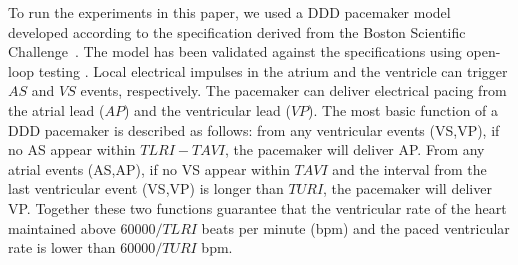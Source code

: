 To run the experiments in this paper, we used a DDD pacemaker model developed according to the specification derived from the Boston Scientific Challenge~\cite{challenge}.
The model has been validated against the specifications using open-loop testing \cite{testing}. 
Local electrical impulses in the atrium and the ventricle can trigger $AS$ and $VS$ events, respectively. The pacemaker can deliver electrical pacing from the atrial lead ($AP$) and the ventricular lead ($VP$). 
The most basic function of a DDD pacemaker is described as follows: 
from any ventricular events (VS,VP), if no AS appear within $TLRI-TAVI$, the pacemaker will deliver AP. 
From any atrial events (AS,AP), if no VS appear within $TAVI$ and the interval from the last ventricular event (VS,VP) is longer than $TURI$, the  pacemaker will deliver VP. 
Together these two functions guarantee that the ventricular rate of the heart maintained above $60000/TLRI$ beats per minute (bpm) and the paced ventricular rate is lower than $60000/TURI$ bpm.

%
%
%
%
%
